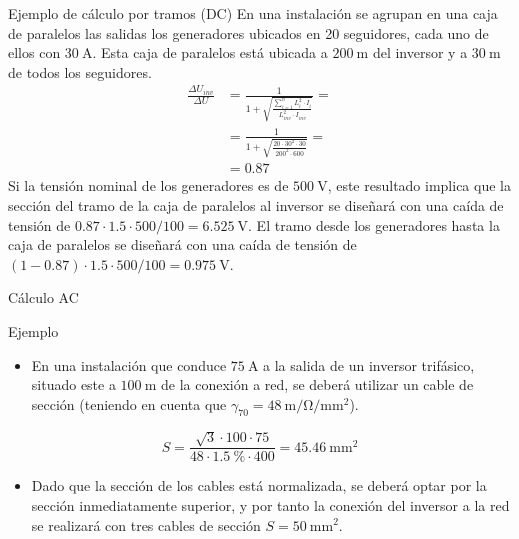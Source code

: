 \documentclass[aspectratio=169, usenames,svgnames,dvipsnames]{beamer}
\begin{document}
\begin{frame}[label={sec:orgf929b0f}]{Ejemplo de cálculo por tramos (DC)}
En una instalación se agrupan en una caja de paralelos las salidas los generadores ubicados en 20 seguidores, cada uno de ellos con \(\qty{30}{\ampere}\). Esta caja de paralelos está ubicada a \(\qty{200}{\meter}\) del inversor y a \(\qty{30}{\meter}\) de todos los seguidores.
\begin{align*}
  \frac{\Delta U_{inv}}{\Delta U} &= \frac{1}{1+\sqrt{\frac{\sum_{i=1}^nL_{i}^2
                                    \cdot I_{i}}{L_{inv}^2 \cdot I_{inv}}}} = \\
                                  &=\frac{1}{1 + \sqrt{\frac{20 \cdot 30^2 \cdot 30}{200^2 \cdot 600 }}} = \\
                                  &= \num{0.87}
\end{align*}
Si la tensión nominal de los generadores es de \(\qty{500}{\volt}\), este resultado implica que la sección del tramo de la caja de paralelos al inversor se diseñará con una caída de tensión de \(\num{0.87} \cdot \num{1.5} \cdot 500 /100 = \qty{6.525}{\volt}\). El tramo desde los generadores hasta la caja de paralelos se diseñará con una caída de tensión de \((1 - \num{0.87}) \cdot \num{1.5} \cdot 500 /100 = \qty{0.975}{\volt}\).
\end{frame}

\begin{frame}[label={sec:orgb951039}]{Cálculo AC}
\begin{block}{Ejemplo}
\begin{itemize}
\item En una instalación que conduce \(\qty{75}{\ampere}\) a la salida de un
inversor trifásico, situado este a \(\qty{100}{\meter}\) de la conexión
a red, se deberá utilizar un cable de sección (teniendo en cuenta
que \(\gamma_{70} = \qty{48}{\meter\per\ohm\per\milli\meter\squared}\)).
\end{itemize}


\[
  S=\frac{\sqrt{3} \cdot 100 \cdot 75}{48 \cdot \qty{1.5}{\percent}\cdot400}=\qty{45.46}{\milli\meter\squared}
\]

\begin{itemize}
\item Dado que la sección de los cables está normalizada, se deberá optar
por la sección inmediatamente superior, y por tanto la conexión del
inversor a la red se realizará con tres cables de sección
\(S=\qty{50}{\milli\meter\squared}\).
\end{itemize}
\end{block}
\end{frame}
\end{document}

